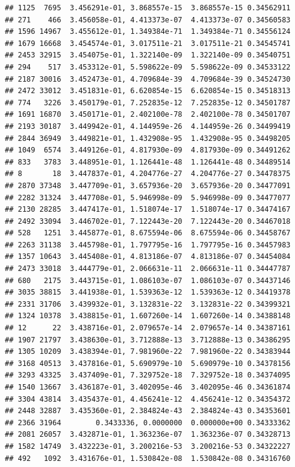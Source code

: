 \documentclass[
]{article}
\begin{document}
\begin{verbatim}
## 1125  7695  3.456291e-01, 3.868557e-15  3.868557e-15 0.34562911
## 271    466  3.456058e-01, 4.413373e-07  4.413373e-07 0.34560583
## 1596 14967  3.455612e-01, 1.349384e-71  1.349384e-71 0.34556124
## 1679 16668  3.454574e-01, 3.017511e-21  3.017511e-21 0.34545741
## 2453 32915  3.454075e-01, 1.322140e-09  1.322140e-09 0.34540751
## 294    517  3.453312e-01, 5.598622e-09  5.598622e-09 0.34533122
## 2187 30016  3.452473e-01, 4.709684e-39  4.709684e-39 0.34524730
## 2472 33012  3.451831e-01, 6.620854e-15  6.620854e-15 0.34518313
## 774   3226  3.450179e-01, 7.252835e-12  7.252835e-12 0.34501787
## 1691 16870  3.450171e-01, 2.402100e-78  2.402100e-78 0.34501707
## 2193 30187  3.449942e-01, 4.144959e-26  4.144959e-26 0.34499419
## 2844 36949  3.449821e-01, 1.432908e-95  1.432908e-95 0.34498205
## 1049  6574  3.449126e-01, 4.817930e-09  4.817930e-09 0.34491262
## 833   3783  3.448951e-01, 1.126441e-48  1.126441e-48 0.34489514
## 8       18  3.447837e-01, 4.204776e-27  4.204776e-27 0.34478375
## 2870 37348  3.447709e-01, 3.657936e-20  3.657936e-20 0.34477091
## 2282 31324  3.447708e-01, 5.946998e-09  5.946998e-09 0.34477077
## 2130 28285  3.447417e-01, 1.518074e-17  1.518074e-17 0.34474167
## 2492 33094  3.446702e-01, 7.122443e-20  7.122443e-20 0.34467018
## 528   1251  3.445877e-01, 8.675594e-06  8.675594e-06 0.34458767
## 2263 31138  3.445798e-01, 1.797795e-16  1.797795e-16 0.34457983
## 1357 10643  3.445408e-01, 4.813186e-07  4.813186e-07 0.34454084
## 2473 33018  3.444779e-01, 2.066631e-11  2.066631e-11 0.34447787
## 680   2175  3.443715e-01, 1.086103e-07  1.086103e-07 0.34437146
## 3035 38815  3.441938e-01, 1.539363e-12  1.539363e-12 0.34419378
## 2331 31706  3.439932e-01, 3.132831e-22  3.132831e-22 0.34399321
## 1324 10378  3.438815e-01, 1.607260e-14  1.607260e-14 0.34388148
## 12      22  3.438716e-01, 2.079657e-14  2.079657e-14 0.34387161
## 1907 21797  3.438630e-01, 3.712888e-13  3.712888e-13 0.34386295
## 1305 10209  3.438394e-01, 7.981960e-22  7.981960e-22 0.34383944
## 3168 40513  3.437816e-01, 5.690979e-10  5.690979e-10 0.34378156
## 3293 43325  3.437409e-01, 7.329752e-18  7.329752e-18 0.34374095
## 1540 13667  3.436187e-01, 3.402095e-46  3.402095e-46 0.34361874
## 3304 43814  3.435437e-01, 4.456241e-12  4.456241e-12 0.34354372
## 2448 32887  3.435360e-01, 2.384824e-43  2.384824e-43 0.34353601
## 2366 31964        0.3433336, 0.0000000  0.000000e+00 0.34333362
## 2081 26057  3.432871e-01, 1.363236e-07  1.363236e-07 0.34328713
## 1582 14749  3.432223e-01, 3.200216e-53  3.200216e-53 0.34322227
## 492   1092  3.431676e-01, 1.530842e-08  1.530842e-08 0.34316760

\end{verbatim}
\end{document}
